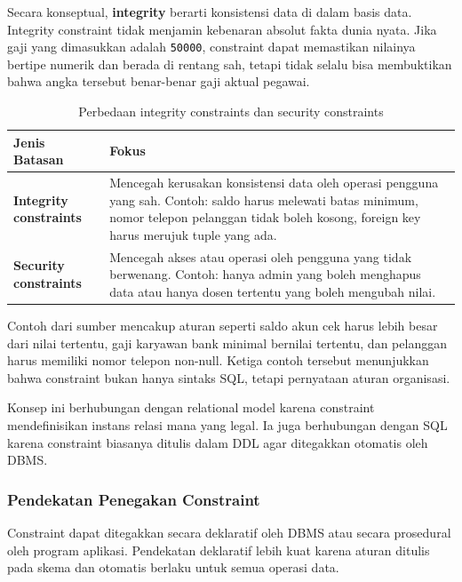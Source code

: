 Secara konseptual, \textbf{integrity} berarti konsistensi data di dalam basis data. Integrity constraint tidak menjamin kebenaran absolut fakta dunia nyata. Jika gaji yang dimasukkan adalah \texttt{50000}, constraint dapat memastikan nilainya bertipe numerik dan berada di rentang sah, tetapi tidak selalu bisa membuktikan bahwa angka tersebut benar-benar gaji aktual pegawai.

\begin{table}[H]
\centering
\begin{tabularx}{\textwidth}{|L{0.28\textwidth}|X|}
\hline
\textbf{Jenis Batasan} & \textbf{Fokus} \\
\hline
\textbf{Integrity constraints} & Mencegah kerusakan konsistensi data oleh operasi pengguna yang sah. Contoh: saldo harus melewati batas minimum, nomor telepon pelanggan tidak boleh kosong, foreign key harus merujuk tuple yang ada. \\
\hline
\textbf{Security constraints} & Mencegah akses atau operasi oleh pengguna yang tidak berwenang. Contoh: hanya admin yang boleh menghapus data atau hanya dosen tertentu yang boleh mengubah nilai. \\
\hline
\end{tabularx}
\caption{Perbedaan integrity constraints dan security constraints}
\label{tab:integrity-vs-security}
\end{table}

Contoh dari sumber mencakup aturan seperti saldo akun cek harus lebih besar dari nilai tertentu, gaji karyawan bank minimal bernilai tertentu, dan pelanggan harus memiliki nomor telepon non-null. Ketiga contoh tersebut menunjukkan bahwa constraint bukan hanya sintaks SQL, tetapi pernyataan aturan organisasi.

Konsep ini berhubungan dengan relational model karena constraint mendefinisikan instans relasi mana yang legal. Ia juga berhubungan dengan SQL karena constraint biasanya ditulis dalam DDL agar ditegakkan otomatis oleh DBMS.

\subsubsection{Pendekatan Penegakan Constraint}

\begin{jawab}
Constraint dapat ditegakkan secara deklaratif oleh DBMS atau secara prosedural oleh program aplikasi. Pendekatan deklaratif lebih kuat karena aturan ditulis pada skema dan otomatis berlaku untuk semua operasi data.
\end{jawab}

